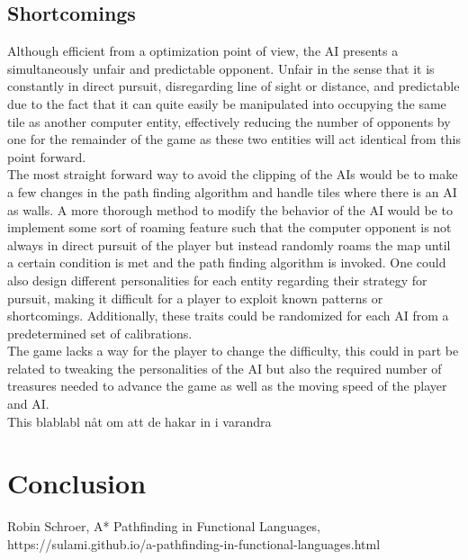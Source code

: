 \documentclass{article}
\begin{document}
\subsection{Shortcomings}
Although efficient from a optimization point of view, the AI presents a simultaneously unfair and predictable opponent. Unfair in the sense that it is constantly in direct pursuit, disregarding line of sight or distance, and predictable due to the fact that it can quite easily be manipulated into occupying the same tile as another computer entity, effectively reducing the number of opponents by one for the remainder of the game as these two entities will act identical from this point forward.\\
\newline
The most straight forward way to avoid the clipping of the AIs would be to make a few changes in the path finding algorithm and handle tiles where there is an AI as walls. A more thorough method to modify the behavior of the AI would be to implement some sort of roaming feature such that the computer opponent is not always in direct pursuit of the player but instead randomly roams the map until a certain condition is met and the path finding algorithm is invoked. One could also design different personalities for each entity regarding their strategy for pursuit, making it difficult for a player to exploit known patterns or shortcomings. Additionally, these traits could be randomized for each AI from a predetermined set of calibrations.\\
\newline
The game lacks a way for the player to change the difficulty, this could in part be related to tweaking the personalities of the AI but also the required number of treasures needed to advance the game as well as the moving speed of the player and AI.\\
\newline
This blablabl nåt om att de hakar in i varandra
\section{Conclusion}


\begin{thebibliography}{9}

  Robin Schroer,
  A* Pathfinding in Functional Languages,
  https://sulami.github.io/a-pathfinding-in-functional-languages.html

\end{thebibliography}
\end{document}
